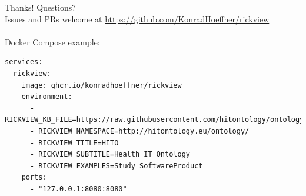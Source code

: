 \documentclass[14pt,aspectratio=169]{beamer}
\begin{document}
\begin{frame}[fragile]{Thanks! Questions?}
~\\
Issues and PRs welcome at \url{https://github.com/KonradHoeffner/rickview}\\
~\\
Docker Compose example:
\scriptsize
\begin{verbatim}
services:
  rickview:
    image: ghcr.io/konradhoeffner/rickview
    environment:
      - RICKVIEW_KB_FILE=https://raw.githubusercontent.com/hitontology/ontology/dist/all.ttl
      - RICKVIEW_NAMESPACE=http://hitontology.eu/ontology/
      - RICKVIEW_TITLE=HITO
      - RICKVIEW_SUBTITLE=Health IT Ontology
      - RICKVIEW_EXAMPLES=Study SoftwareProduct
    ports:
      - "127.0.0.1:8080:8080"
\end{verbatim}
\end{frame}
\end{document}
